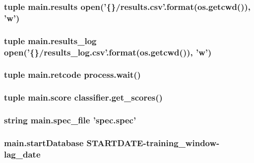 \hypertarget{namespacemain_aebf74fc505cbd00f19e130b462531252}{
\subsubsection[{results}]{\setlength{\rightskip}{0pt plus 5cm}tuple main.\-results open('\{\}/results.\-csv'.format(os.\-getcwd()), 'w')}}\label{namespacemain_aebf74fc505cbd00f19e130b462531252}
\hypertarget{namespacemain_a41cda8ca94e912c8abb2d5f880118cc4}{
\subsubsection[{results\-\_\-log}]{\setlength{\rightskip}{0pt plus 5cm}tuple main.\-results\-\_\-log open('\{\}/results\-\_\-log.\-csv'.format(os.\-getcwd()), 'w')}}\label{namespacemain_a41cda8ca94e912c8abb2d5f880118cc4}
\hypertarget{namespacemain_ae992f00b1fb1709567ce49dfc1e91993}{
\subsubsection[{retcode}]{\setlength{\rightskip}{0pt plus 5cm}tuple main.\-retcode process.\-wait()}}\label{namespacemain_ae992f00b1fb1709567ce49dfc1e91993}
\hypertarget{namespacemain_a52dcd672d21ad23f8d3db387b1b17983}{
\subsubsection[{score}]{\setlength{\rightskip}{0pt plus 5cm}tuple main.\-score classifier.\-get\-\_\-scores()}}\label{namespacemain_a52dcd672d21ad23f8d3db387b1b17983}
\hypertarget{namespacemain_addc9c6a1eb509aa124df4c1fa66cf891}{
\subsubsection[{spec\-\_\-file}]{\setlength{\rightskip}{0pt plus 5cm}string main.\-spec\-\_\-file 'spec.\-spec'}}\label{namespacemain_addc9c6a1eb509aa124df4c1fa66cf891}
\hypertarget{namespacemain_a7fa968fb4b6bd3982ff2852514448277}{
\subsubsection[{start\-Database}]{\setlength{\rightskip}{0pt plus 5cm}main.\-start\-Database S\-T\-A\-R\-T\-D\-A\-T\-E-\/training\-\_\-window-\/lag\-\_\-date}}\label{namespacemain_a7fa968fb4b6bd3982ff2852514448277}
